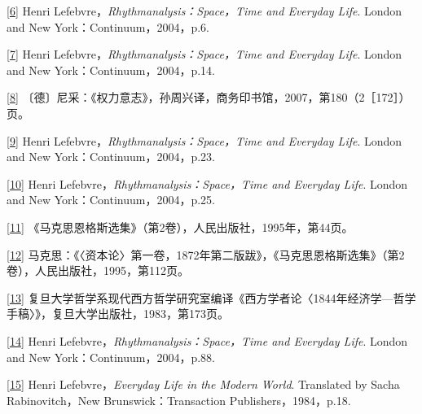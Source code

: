 \documentclass[UTF8, fontset = sourcesans, a4paper, oneside, zihao =
-4, scheme=chinese, no-math, space=true]{ctexbook}
\begin{document}
\protect\hypertarget{part0009_split_004.htmlux5cux23m6}{}{}\protect\hyperlink{part0009_split_001.htmlux5cux23w6}{{[}6{]}}
Henri Lefebvre，\emph{Rhythmanalysis：Space，Time and Everyday Life}.
London and New York：Continuum，2004，p.6.

\protect\hypertarget{part0009_split_004.htmlux5cux23m7}{}{}\protect\hyperlink{part0009_split_001.htmlux5cux23w7}{{[}7{]}}
Henri Lefebvre，\emph{Rhythmanalysis：Space，Time and Everyday Life}.
London and New York：Continuum，2004，p.14.

\protect\hypertarget{part0009_split_004.htmlux5cux23m8}{}{}\protect\hyperlink{part0009_split_001.htmlux5cux23w8}{{[}8{]}}
〔德〕尼采：《权力意志》，孙周兴译，商务印书馆，2007，第180（2［172］）页。

\protect\hypertarget{part0009_split_004.htmlux5cux23m9}{}{}\protect\hyperlink{part0009_split_001.htmlux5cux23w9}{{[}9{]}}
Henri Lefebvre，\emph{Rhythmanalysis：Space，Time and Everyday Life}.
London and New York：Continuum，2004，p.23.

\protect\hypertarget{part0009_split_004.htmlux5cux23m10}{}{}\protect\hyperlink{part0009_split_001.htmlux5cux23w10}{{[}10{]}}
Henri Lefebvre，\emph{Rhythmanalysis：Space，Time and Everyday Life}.
London and New York：Continuum，2004，p.25.

\protect\hypertarget{part0009_split_004.htmlux5cux23m11}{}{}\protect\hyperlink{part0009_split_001.htmlux5cux23w11}{{[}11{]}}
《马克思恩格斯选集》（第2卷），人民出版社，1995年，第44页。

\protect\hypertarget{part0009_split_004.htmlux5cux23m12}{}{}\protect\hyperlink{part0009_split_001.htmlux5cux23w12}{{[}12{]}}
马克思：《〈资本论〉第一卷，1872年第二版跋》，《马克思恩格斯选集》（第2卷），人民出版社，1995，第112页。

\protect\hypertarget{part0009_split_004.htmlux5cux23m13}{}{}\protect\hyperlink{part0009_split_001.htmlux5cux23w13}{{[}13{]}}
复旦大学哲学系现代西方哲学研究室编译《西方学者论〈1844年经济学---哲学手稿〉》，复旦大学出版社，1983，第173页。

\protect\hypertarget{part0009_split_004.htmlux5cux23m14}{}{}\protect\hyperlink{part0009_split_001.htmlux5cux23w14}{{[}14{]}}
Henri Lefebvre，\emph{Rhythmanalysis：Space，Time and Everyday Life}.
London and New York：Continuum，2004，p.88.

\protect\hypertarget{part0009_split_004.htmlux5cux23m15}{}{}\protect\hyperlink{part0009_split_002.htmlux5cux23w15}{{[}15{]}}
Henri Lefebvre，\emph{Everyday Life in the Modern World}. Translated by
Sacha Rabinovitch，New Brunswick：Transaction Publishers，1984，p.18.
\end{document}
